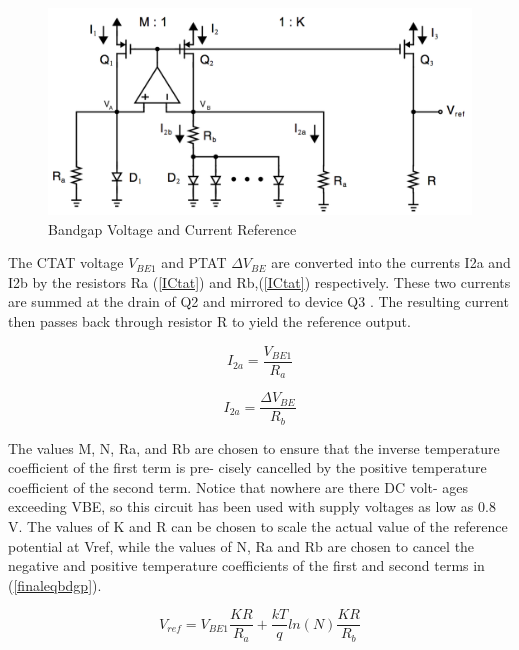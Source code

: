 \documentclass[11pt,a4paper]{report}
\begin{document}
\begin{figure}[h]
  \begin{center}
    \includegraphics[scale=0.4]{photo/Figure_basique}
  \end{center}
  \caption{Bandgap Voltage and Current Reference}
  \label{bandgap_2pnp}
\end{figure}

The CTAT voltage $V_{BE1}$ and PTAT $\Delta V_{BE}$ are converted into the currents I2a and I2b by the resistors Ra (\ref{ICtat}) and Rb,(\ref{ICtat}) respectively.
These two currents are summed at the drain of Q2 and mirrored to device Q3 . The resulting current then passes back through resistor R to yield the reference output.

\begin{equation}
  I_{2a} = \frac{V_{BE1}}{R_a}
  \label{ICtat}
\end{equation}

\begin{equation}
  I_{2a} = \frac{\Delta V_{BE}}{R_b}
  \label{IPtat}
\end{equation}

The values M, N, Ra, and Rb are chosen to ensure that the inverse temperature coefficient of the first term is pre- cisely cancelled by the positive temperature coefficient of the second term. Notice that nowhere are there DC volt- ages exceeding VBE, so this circuit has been used with supply voltages as low as 0.8 V. The values of K and R can be chosen to scale the actual value of the reference potential at Vref, while the values of N, Ra and Rb are chosen to cancel the negative and positive temperature coefficients of the first and second terms in (\ref{finaleqbdgp}).

\begin{equation}
  V_{ref} = V_{BE1} \frac{KR}{R_a} + \frac{kT}{q}ln(N) \frac{KR}{R_b} 
  \label{finaleqbdgp}
\end{equation}
\end{document}
